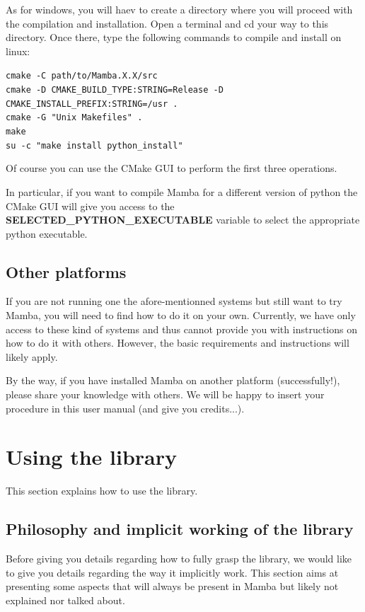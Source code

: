 \documentclass[a4paper,10pt,oneside]{article}
\begin{document}
As for windows, you will haev to create a directory where you will proceed with
the compilation and installation. Open a terminal and cd your way to this 
directory. Once there, type the following commands to compile and install on linux:

\texttt{cmake -C path/to/Mamba.X.X/src}\\
\texttt{cmake -D CMAKE\_BUILD\_TYPE:STRING=Release -D CMAKE\_INSTALL\_PREFIX:STRING=/usr .}\\
\texttt{cmake -G "Unix Makefiles" .}\\
\texttt{make}\\
\texttt{su -c "make install python\_install"}

Of course you can use the CMake GUI to perform the first three operations.

In particular, if you want to compile Mamba for a different version of python
the CMake GUI will give you access to the \textbf{SELECTED\_PYTHON\_EXECUTABLE}
variable to select the appropriate python executable.

\subsection{Other platforms}

If you are not running one the afore-mentionned systems but still want to try
Mamba, you will need to find how to do it on your own. Currently, we have only access to
these kind of systems and thus cannot provide you with instructions on how to do
it with others. However, the basic requirements and instructions will likely apply.

By the way, if you have installed Mamba on another platform (successfully!), please
share your knowledge with others. We will be happy to insert your procedure in this
user manual (and give you credits...).

\pagebreak

\section{Using the library}
\label{cha:using_library}

This section explains how to use the library.

\subsection{Philosophy and implicit working of the library}

Before giving you details regarding how to fully grasp the library, we would
like to give you details regarding the way it implicitly work. This section aims
at presenting some aspects that will always be present in Mamba but likely not 
explained nor talked about.
\end{document}

